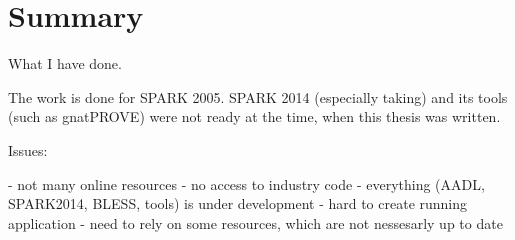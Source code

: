 
\cleardoublepage

\chapter{Summary}
\label{summary}

What I have done.

The work is done for SPARK 2005. SPARK 2014 (especially taking) and its tools (such as gnatPROVE) were not ready at the time, when this thesis was written.

Issues:

- not many online resources
- no access to industry code
- everything (AADL, SPARK2014, BLESS, tools) is under development
- hard to create running application
- need to rely on some resources, which are not nessesarly up to date
